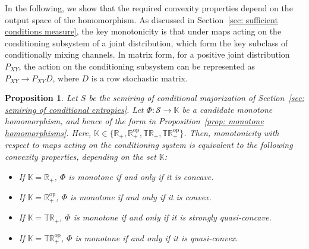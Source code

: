 \documentclass[aps,pra,11pt,onecolumn,nofootinbib,tightenlines]{revtex4-2}
\newtheorem{proposition}[theorem]{Proposition}
\theoremstyle{definition}
\newcommand{\cS}{\mathcal{S}}
\begin{document}
 In the following, we show that the required convexity properties depend on the output space of the homomorphism. As discussed in Section~\ref{sec: sufficient conditions measure}, the key monotonicity is that under maps acting on the conditioning subsystem of a joint distribution, which form the key subclass of conditionally mixing channels. In matrix form, for a positive joint distribution $P_{XY}$, the action on the conditioning subsystem can be represented as $ P_{XY}\rightarrow P_{XY} D$, where $D$ is a row stochastic matrix.

\begin{proposition}\label{prop:convconc}
Let $S$ be the semiring of conditional majorization of Section~\ref{sec: semiring of conditional entropies}. Let
$\Phi: \cS \to \mathbb{K}$ be a candidate monotone homomorphism, and hence of the form in Proposition~\eqref{prop: monotone homomorphisms}. Here, $\mathbb{K} \in \{\mathbb{R}_+,  \mathbb{R}_+^{\mathrm{op}},\mathbb{TR}_+,\mathbb{TR}_+^{\mathrm{op}}\}$. Then, monotonicity with respect to maps acting on the conditioning system is equivalent to the following convexity properties, depending on the set $\mathbb{K}$:
\begin{itemize}[itemsep=0pt, topsep=5pt]
\item If $\mathbb{K} =\mathbb{R}_+$, $\Phi$ is monotone if and only if it is concave.
\item If $ \mathbb{K}= \mathbb{R}_+^{\mathrm{op}}$, $\Phi$ is monotone if and only if it is convex.
\item If $ \mathbb{K}=\mathbb{TR}_+$, $\Phi$ is monotone if and only if it is strongly quasi-concave.
\item If $ \mathbb{K}=\mathbb{TR}_+^{\mathrm{op}}$, $\Phi$ is monotone if and only if it is quasi-convex.
\end{itemize}
\end{proposition}
\end{document}
